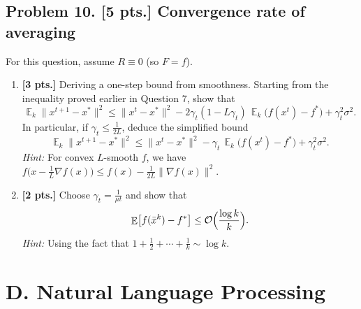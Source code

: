 \documentclass[11pt,a4paper]{article}
\DeclareMathOperator{\E}{\mathbb{E}}
\begin{document}
\subsection{Problem 10. [5 pts.] Convergence rate of averaging}
For this question, assume $R \equiv 0$ (so $F = f$).
\begin{enumerate}[label=(\alph*)]
    \item \textbf{[3 pts.]} Deriving a one-step bound from smoothness. Starting from the inequality proved earlier in Question 7, show that
    \[
    \E_k \|x^{t+1} - x^{*}\|^{2} \le \|x^{t} - x^{*}\|^{2} - 2\gamma_t (1 - L\gamma_t)\, \E_k\bigl(f(x^{t}) - f^{*}\bigr) + \gamma_t^{2} \sigma^{2}.
    \]
    In particular, if $\gamma_t \le \frac{1}{2L}$, deduce the simplified bound
    \[
    \E_k \|x^{t+1} - x^{*}\|^{2} \le \|x^{t} - x^{*}\|^{2} - \gamma_t\, \E_k\bigl(f(x^{t}) - f^{*}\bigr) + \gamma_t^{2} \sigma^{2}.
    \]
    \textit{Hint:} For convex $L$-smooth $f$, we have $f\bigl(x - \frac{1}{L}\nabla f(x)\bigr) \le f(x) - \frac{1}{2L}\|\nabla f(x)\|^{2}$.
    \item \textbf{[2 pts.]} Choose $\gamma_t = \frac{1}{\mu t}$ and show that
    \[
    \E\bigl[f(\bar{x}^{k}) - f^{*}\bigr] \le \mathcal{O}\Bigl(\frac{\log k}{k}\Bigr).
    \]
    \textit{Hint:} Using the fact that $1 + \frac{1}{2} + \cdots + \frac{1}{k} \sim \log k$.
\end{enumerate}

\section{D. Natural Language Processing}
\end{document}
